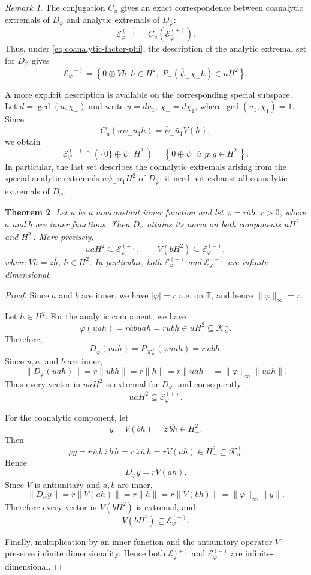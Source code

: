 \documentclass[12pt]{amsart}
\newtheorem{theorem}{Theorem}[section]
\theoremstyle{definition}
\theoremstyle{remark}
\newtheorem{remark}[theorem]{Remark}
\def \T{\mathbb{T}}
\newcommand{\cle}{\mathcal{E}}
\newcommand{\clk}{\mathcal{K}}
\newcommand{\vp}{\varphi}
\numberwithin{equation}{section}
\begin{document}
\begin{remark}
The conjugation $C_u$ gives an exact correspondence between coanalytic extremals of $D_\vp$ and analytic extremals of $D_{\bar{\vp}}$:
\[
\cle_\vp^{(-)}=C_u\left(\cle_{\bar{\vp}}^{(+)}\right).
\]
Thus, under \eqref{eq:coanalytic-factor-phi}, the description of the analytic extremal set for $D_{\bar{\vp}}$ gives
\[
\cle_\vp^{(-)}=\left\{0\oplus Vh:h\in H^2,\;P_{+}\left(\bar\psi_{-}\chi_{-}h\right)\in uH^2\right\}.
\]
	
A more explicit description is available on the corresponding special subspace. Let $d=\gcd(u,\chi_{-})$ and write $u=du_1$, $\chi_{-}=d\chi_1$, where $\gcd(u_1,\chi_1)=1$. Since
\[
C_u(u\psi_{-}u_1h)=\bar\psi_{-}\bar{u}_1V(h),
\]
we obtain
\[
\cle_\vp^{(-)}\cap\left(\{0\}\oplus\bar\psi_{-}H^2_{-}\right)
=\left\{0\oplus\bar\psi_{-}\bar{u}_1g:g\in H^2_{-}\right\}.
\]
In particular, the last set describes the coanalytic extremals
arising from the special analytic extremals $u\psi_{-}u_1H^2$ of $D_{\bar{\vp}}$; it need not exhaust all coanalytic extremals of $D_\vp$.
\end{remark}


\begin{theorem}\label{thm:quotient-inner-extremals}
Let $u$ be a nonconstant inner function and let $\vp=r\overline{a}b$, $r>0$, where $a$ and $b$ are inner functions. Then $D_\vp$ attains its norm
on both components $uH^2$ and $H^2_{-}$. More precisely,
\[
u aH^2\subseteq \cle_\vp^{(+)},\qquad
V(bH^2)\subseteq \cle_\vp^{(-)},
\]
where $Vh=\overline{z}\overline{h}$, $h\in H^2$. In particular, both $\cle_\vp^{(+)}$ and $\cle_\vp^{(-)}$ are infinite-dimensional.
\end{theorem}

\begin{proof}
Since $a$ and $b$ are inner, we have $|\vp|=r$ a.e. on $\T$, and hence $\|\vp\|_\infty=r$.
	
Let $h\in H^2$. For the analytic component, we have
\[
\vp(uah)=r\overline{a}buah
=rubh\in uH^2\subseteq\clk_u^\perp.
\]
Therefore,
\[
D_\vp(uah)=P_{\clk_u^\perp}(\vp uah)=r\,ubh.
\]
Since $u,a$, and $b$ are inner,
\[
\|D_\vp(uah)\|=r\|ubh\|=r\|h\|=r\|uah\|=\|\vp\|_\infty\|uah\|.
\]
Thus every vector in $uaH^2$ is extremal for $D_\vp$, and consequently
\[
uaH^2\subseteq\cle_\vp^{(+)}.
\]
	
For the coanalytic component, let
\[
y=V(bh)=\overline{z}\,\overline{bh}\in H^2_{-}.
	\]
Then
\[
\vp y =r\,\overline{a}\,b\,\overline{z}\,\overline b\,\overline{h}
=r\,\overline{z}\,\overline{a}\,\overline{h}
=rV(ah)\in H^2_{-}\subseteq\clk_u^\perp.
\]
Hence
\[
D_\vp y=rV(ah).
\]
Since $V$ is antiunitary and $a,b$ are inner,
\[
\|D_\vp y\|=r\|V(ah)\|=r\|h\|=r\|V(bh)\|=\|\vp\|_\infty\|y\|.
\]
Therefore every vector in $V(bH^2)$ is extremal, and
\[
V(bH^2)\subseteq\cle_\vp^{(-)}.
\]
	
Finally, multiplication by an inner function and the antiunitary
operator $V$ preserve infinite dimensionality. Hence both
$\cle_\vp^{(+)}$ and $\cle_\vp^{(-)}$ are infinite-dimensional.
\end{proof}
\end{document}

